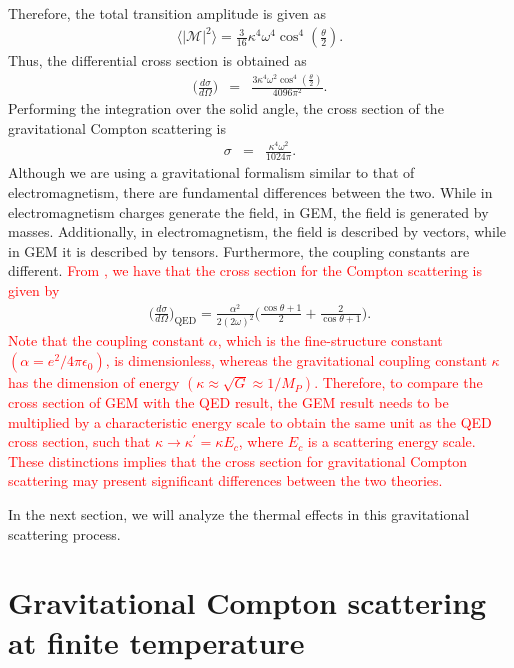 \documentclass[11pt,showpacs,preprintnumbers,amsmath,amssymb,prd,nofootinbib,superscriptaddress]{revtex4-2}
\begin{document}
Therefore, the total transition amplitude is given as
\begin{eqnarray}
    \langle|\mathcal{M}|^2\rangle=\frac{3}{16} \kappa ^4 \omega ^4 \cos ^4\left(\frac{\theta }{2}\right).
\end{eqnarray}
Thus, the differential cross section is obtained as
\begin{eqnarray}
    \Big(\frac{d\sigma}{d\Omega}\Big)&=&\frac{3 \kappa ^4 \omega ^2 \cos ^4\left(\frac{\theta }{2}\right)}{4096 \pi ^2}.\label{44}
\end{eqnarray}
Performing the integration over the solid angle, the cross section of the gravitational Compton scattering is
\begin{eqnarray}
     \sigma&=&\frac{\kappa^4\omega^2}{1024\pi}.
\end{eqnarray}
Although we are using a gravitational formalism similar to that of electromagnetism, there are fundamental differences between the two. While in electromagnetism charges generate the field, in GEM, the field is generated by masses. Additionally, in electromagnetism, the field is described by vectors, while in GEM it is described by tensors. Furthermore, the coupling constants are different. \textcolor{red}{From \cite{cabral}, we have that the cross section for the Compton scattering is given by}
{\color{red}\begin{eqnarray}
		\bigg(\frac{d\sigma}{d\Omega}\bigg)_{\text{QED}}=\frac{\alpha^2}{2(2\omega)^2}\bigg(\frac{\cos\theta+1}{2}+\frac{2}{\cos\theta+1}\bigg).
\end{eqnarray}}
 \textcolor{red}{Note that the coupling constant $\alpha$, which is the fine-structure constant $(\alpha = e^2 / 4\pi\epsilon_0)$, is dimensionless, whereas the gravitational coupling constant $\kappa$ has the dimension of energy $(\kappa \approx \sqrt{G} \approx 1/M_P)$. Therefore, to compare the cross section of GEM with the QED result, the GEM result needs to be multiplied by a characteristic energy scale to obtain the same unit as the QED cross section, such that $\kappa \to \kappa^\prime = \kappa E_c$, where $E_c$ is a scattering energy scale. These distinctions implies that the cross section for gravitational Compton scattering may present significant differences between the two theories.}

In the next section, we will analyze the thermal effects in this gravitational scattering process.

\section{Gravitational Compton scattering at finite temperature} \label{IV}
\end{document}
